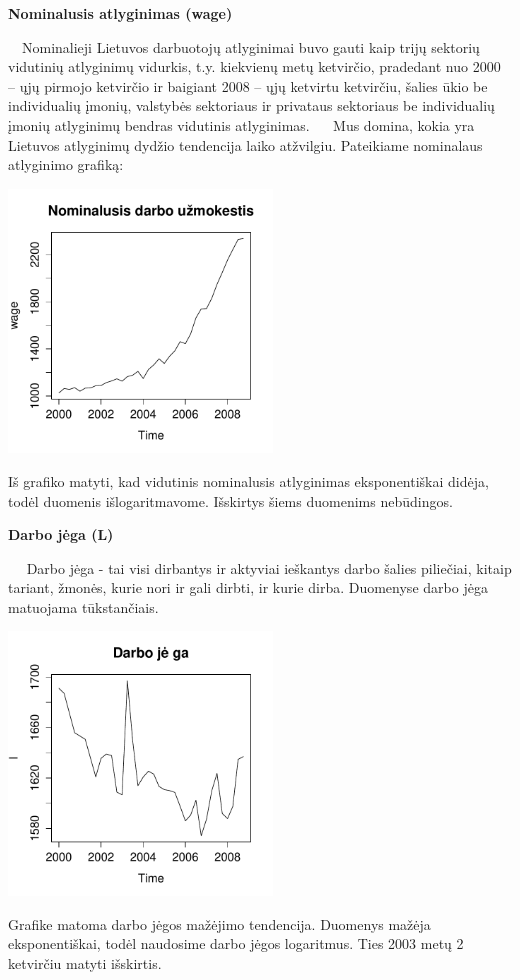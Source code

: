 \documentclass[12pt,a4paper]{article}
\theoremstyle{change}\newtheorem{salyga}{Uždavinys}
\begin{document}
\begin{flushleft}
\textbf{\Large {Nominalusis atlyginimas (wage)}}
\end{flushleft}
\vskip 15pt
$\quad$Nominalieji Lietuvos darbuotojų atlyginimai buvo gauti kaip trijų sektorių vidutinių atlyginimų vidurkis, t.y. kiekvienų metų ketvirčio, pradedant nuo 2000 – ųjų pirmojo ketvirčio ir baigiant 2008 – ųjų ketvirtu ketvirčiu, šalies ūkio be individualių įmonių, valstybės sektoriaus ir privataus sektoriaus be individualių įmonių atlyginimų bendras vidutinis atlyginimas.
\vskip 0pt
$\quad$ Mus domina, kokia yra Lietuvos atlyginimų dydžio tendencija laiko atžvilgiu. Pateikiame nominalaus atlyginimo grafiką:
\\
\begin{center}
\includegraphics[width=70mm,height=70mm]{nwage}
\end{center}
Iš grafiko matyti, kad vidutinis nominalusis atlyginimas eksponentiškai didėja, todėl duomenis išlogaritmavome. Išskirtys šiems duomenims nebūdingos. 

\begin{flushleft}
\textbf{\Large {Darbo jėga (L)}}
\end{flushleft}
\vskip 15pt
$\quad$ Darbo jėga - tai visi dirbantys ir aktyviai ieškantys darbo šalies piliečiai, kitaip tariant, žmonės, kurie nori ir gali dirbti, ir kurie dirba. Duomenyse darbo jėga matuojama tūkstančiais. 
\\
\begin{center}
\includegraphics[width=70mm,height=70mm]{l}
\end{center}
Grafike matoma darbo jėgos mažėjimo tendencija. Duomenys mažėja eksponentiškai, todėl naudosime darbo jėgos logaritmus. Ties 2003 metų 2 ketvirčiu matyti išskirtis.
\end{document}
